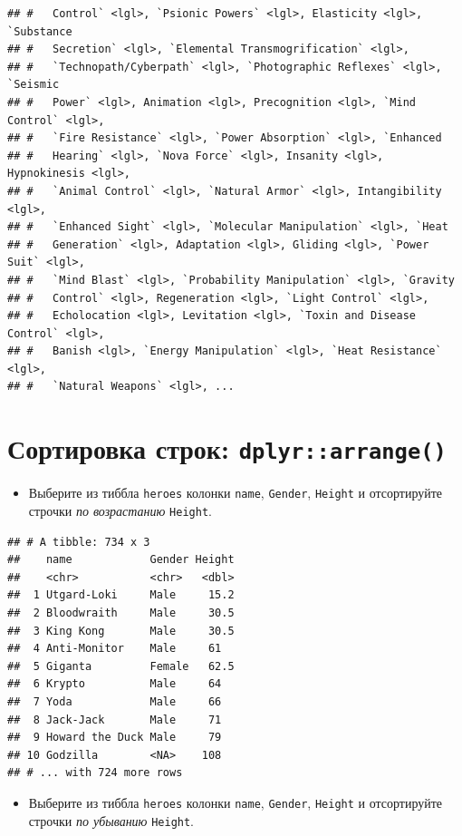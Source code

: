 \documentclass[]{book}
\providecommand{\tightlist}{%
  \setlength{\itemsep}{0pt}\setlength{\parskip}{0pt}}
\begin{document}
\begin{verbatim}
## #   Control` <lgl>, `Psionic Powers` <lgl>, Elasticity <lgl>, `Substance
## #   Secretion` <lgl>, `Elemental Transmogrification` <lgl>,
## #   `Technopath/Cyberpath` <lgl>, `Photographic Reflexes` <lgl>, `Seismic
## #   Power` <lgl>, Animation <lgl>, Precognition <lgl>, `Mind Control` <lgl>,
## #   `Fire Resistance` <lgl>, `Power Absorption` <lgl>, `Enhanced
## #   Hearing` <lgl>, `Nova Force` <lgl>, Insanity <lgl>, Hypnokinesis <lgl>,
## #   `Animal Control` <lgl>, `Natural Armor` <lgl>, Intangibility <lgl>,
## #   `Enhanced Sight` <lgl>, `Molecular Manipulation` <lgl>, `Heat
## #   Generation` <lgl>, Adaptation <lgl>, Gliding <lgl>, `Power Suit` <lgl>,
## #   `Mind Blast` <lgl>, `Probability Manipulation` <lgl>, `Gravity
## #   Control` <lgl>, Regeneration <lgl>, `Light Control` <lgl>,
## #   Echolocation <lgl>, Levitation <lgl>, `Toxin and Disease Control` <lgl>,
## #   Banish <lgl>, `Energy Manipulation` <lgl>, `Heat Resistance` <lgl>,
## #   `Natural Weapons` <lgl>, ...
\end{verbatim}

\section{\texorpdfstring{Сортировка строк:
\texttt{dplyr::arrange()}}{Сортировка строк: dplyr::arrange()}}\label{task_arr}

\begin{itemize}
\tightlist
\item
  Выберите из тиббла \texttt{heroes} колонки \texttt{name},
  \texttt{Gender}, \texttt{Height} и отсортируйте строчки \emph{по
  возрастанию} \texttt{Height}.
\end{itemize}

\begin{verbatim}
## # A tibble: 734 x 3
##    name            Gender Height
##    <chr>           <chr>   <dbl>
##  1 Utgard-Loki     Male     15.2
##  2 Bloodwraith     Male     30.5
##  3 King Kong       Male     30.5
##  4 Anti-Monitor    Male     61  
##  5 Giganta         Female   62.5
##  6 Krypto          Male     64  
##  7 Yoda            Male     66  
##  8 Jack-Jack       Male     71  
##  9 Howard the Duck Male     79  
## 10 Godzilla        <NA>    108  
## # ... with 724 more rows
\end{verbatim}

\begin{itemize}
\tightlist
\item
  Выберите из тиббла \texttt{heroes} колонки \texttt{name},
  \texttt{Gender}, \texttt{Height} и отсортируйте строчки \emph{по
  убыванию} \texttt{Height}.
\end{itemize}
\end{document}
